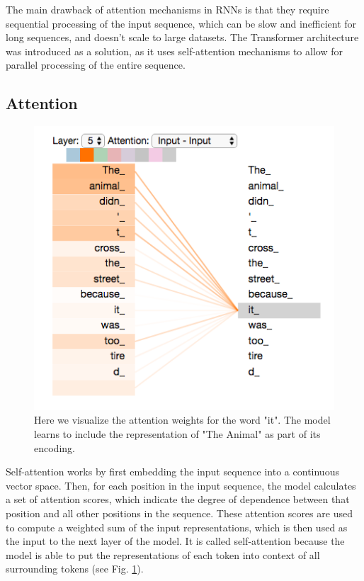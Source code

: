 The main drawback of attention mechanisms in RNNs is that they require sequential processing of the input sequence, which can be slow and inefficient for long sequences, and doesn't scale to large datasets.
The Transformer architecture was introduced as a solution, as it uses self-attention mechanisms to allow for parallel processing of the entire sequence.

\subsection{Attention}
\begin{figure}[h]
    \includegraphics[width=\linewidth]{chapters/NLP/figures/self-attention.png}
    \caption{Here we visualize the attention weights for the word "it". The model learns to include the representation of "The Animal" as part of its encoding.}
    \label{fig:self-attention}
\end{figure}

Self-attention works by first embedding the input sequence into a continuous vector space. Then, for each position in the input sequence, the model calculates a set of attention scores, which indicate the degree of dependence between that position and all other positions in the sequence. These attention scores are used to compute a weighted sum of the input representations, which is then used as the input to the next layer of the model.
It is called self-attention because the model is able to put the representations of each token into context of all surrounding tokens (see Fig. \ref{fig:self-attention}).

